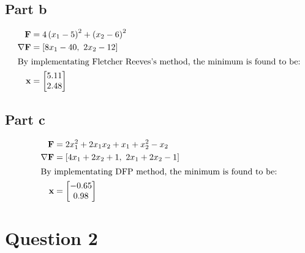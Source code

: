 \documentclass[a4paper,12pt]{article} %
\begin{document}
\subsection*{Part b}
\begin{align*}
    \mathbf{F} &= 4 \left(x_{1} - 5\right)^{2} + \left(x_{2} - 6\right)^{2} \\
    \nabla \mathbf{F}&= \left[ 8 x_{1} - 40, \  2 x_{2} - 12\right]\\
    \intertext{By implementating Fletcher Reeves's method, the minimum is found to be:}
    \mathbf{x} &= \left[\begin{matrix}5.11\\2.48\end{matrix}\right]
\end{align*}

\subsection*{Part c}
\begin{align*}
    \mathbf{F} &= 2 x_{1}^{2} + 2 x_{1} x_{2} + x_{1} + x_{2}^{2} - x_{2} \\
    \nabla \mathbf{F}&= \left[ 4 x_{1} + 2 x_{2} + 1, \  2 x_{1} + 2 x_{2} - 1\right]\\
    \intertext{By implementating DFP method, the minimum is found to be:}
    \mathbf{x} &= \left[\begin{matrix}-0.65\\0.98\end{matrix}\right]
\end{align*}

\section*{\textbf{Question 2}}
\end{document}
